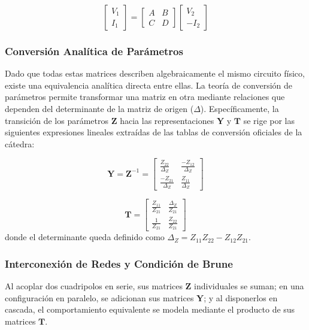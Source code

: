 \begin{equation}
    \begin{bmatrix} V_1 \\ I_1 \end{bmatrix} 
    = 
    \begin{bmatrix} A & B \\ C & D \end{bmatrix} 
    \begin{bmatrix} V_2 \\ -I_2 \end{bmatrix}
\end{equation}

\subsubsection{Conversión Analítica de Parámetros}
Dado que todas estas matrices describen algebraicamente el mismo circuito físico, existe una equivalencia analítica directa entre ellas. La teoría de conversión de parámetros permite transformar una matriz en otra mediante relaciones que dependen del determinante de la matriz de origen ($\Delta$). Específicamente, la transición de los parámetros $\mathbf{Z}$ hacia las representaciones $\mathbf{Y}$ y $\mathbf{T}$ se rige por las siguientes expresiones lineales extraídas de las tablas de conversión oficiales de la cátedra:

\begin{equation}
    \mathbf{Y} = \mathbf{Z}^{-1} = 
    \begin{bmatrix} 
    \frac{Z_{22}}{\Delta_Z} & \frac{-Z_{12}}{\Delta_Z} \\[0.6em] 
    \frac{-Z_{21}}{\Delta_Z} & \frac{Z_{11}}{\Delta_Z} 
    \end{bmatrix}
\end{equation}

\begin{equation}
    \mathbf{T} = 
    \begin{bmatrix} 
    \frac{Z_{11}}{Z_{21}} & \frac{\Delta_Z}{Z_{21}} \\[0.6em] 
    \frac{1}{Z_{21}} & \frac{Z_{22}}{Z_{21}} 
    \end{bmatrix}
    \label{eq:Z_a_T}
\end{equation}
donde el determinante queda definido como $\Delta_Z = Z_{11}Z_{22} - Z_{12}Z_{21}$.

\subsubsection{Interconexión de Redes y Condición de Brune}
Al acoplar dos cuadripolos en serie, sus matrices $\mathbf{Z}$ individuales se suman; en una configuración en paralelo, se adicionan sus matrices $\mathbf{Y}$; y al disponerlos en cascada, el comportamiento equivalente se modela mediante el producto de sus matrices $\mathbf{T}$.

